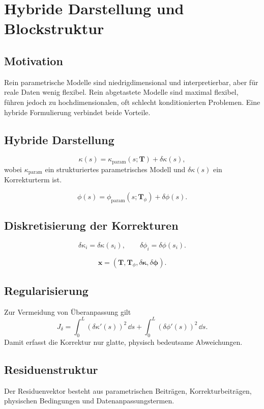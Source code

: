 \section{Hybride Darstellung und Blockstruktur}
\subsection{Motivation}
Rein parametrische Modelle sind niedrigdimensional und interpretierbar, aber
für reale Daten wenig flexibel. Rein abgetastete Modelle sind maximal flexibel,
führen jedoch zu hochdimensionalen, oft schlecht konditionierten Problemen.
Eine hybride Formulierung verbindet beide Vorteile.

\subsection{Hybride Darstellung}
\begin{definition}
\[
\kappa(s)=\kappa_{\mathrm{param}}(s;\mathbf T)+\delta\kappa(s),
\]
wobei \(\kappa_{\mathrm{param}}\) ein strukturiertes parametrisches Modell und
\(\delta\kappa(s)\) ein Korrekturterm ist.
\end{definition}
\begin{definition}
\[
\phi(s)=\phi_{\mathrm{param}}(s;\mathbf T_\phi)+\delta\phi(s).
\]
\end{definition}

\subsection{Diskretisierung der Korrekturen}
\[
\delta\kappa_i=\delta\kappa(s_i),\qquad
\delta\phi_i=\delta\phi(s_i).
\]
\begin{definition}
\[
\mathbf x=(\mathbf T,\mathbf T_\phi,
\delta\boldsymbol\kappa,\delta\boldsymbol\phi).
\]
\end{definition}

\subsection{Regularisierung}
Zur Vermeidung von Überanpassung gilt
\[
J_\delta=\int_0^L(\delta\kappa'(s))^2\,\dd s
+\int_0^L(\delta\phi'(s))^2\,\dd s.
\]
Damit erfasst die Korrektur nur glatte, physisch bedeutsame Abweichungen.

\subsection{Residuenstruktur}
Der Residuenvektor besteht aus parametrischen Beiträgen,
Korrekturbeiträgen, physischen Bedingungen und Datenanpassungstermen.

